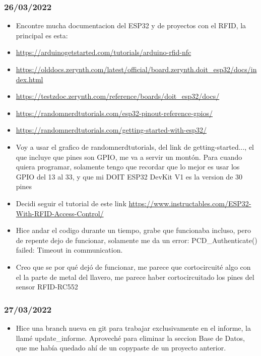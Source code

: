 \documentclass[../main.tex]{subfiles}
\begin{document}
\subsubsection{26/03/2022}
\begin{itemize}
	\item Encontre mucha documentacion del ESP32 y de proyectos con el RFID, la principal es esta:
	\item \url{https://arduinogetstarted.com/tutorials/arduino-rfid-nfc}
	\item \url{https://olddocs.zerynth.com/latest/official/board.zerynth.doit_esp32/docs/index.html}
	\item \url{https://testzdoc.zerynth.com/reference/boards/doit_esp32/docs/}
	\item \url{https://randomnerdtutorials.com/esp32-pinout-reference-gpios/}
	\item \url{https://randomnerdtutorials.com/getting-started-with-esp32/}
	\item Voy a usar el grafico de randomnerdtutorials, del link de getting-started...,
	      el que incluye que pines son GPIO, me va a servir un montón.
	      Para cuando quiera programar, solamente tengo que recordar que lo mejor es usar los
	      GPIO del 13 al 33, y que mi DOIT ESP32 DevKit V1 es la version de 30 pines
	\item Decidi seguir el tutorial de este link
	      \url{https://www.instructables.com/ESP32-With-RFID-Access-Control/}
	\item Hice andar el codigo durante un tiempo, grabe que funcionaba incluso, pero de
	      repente dejo de funcionar, solamente me da un error:
	      PCD\_Authenticate() failed: Timeout in communication.
	\item Creo que se por qué dejó de funcionar, me parece que cortocircuité algo
	      con el la parte de metal del llavero, me parece haber cortocircuitado
	      los pines del sensor RFID-RC552

\end{itemize}
\subsubsection{27/03/2022}
\begin{itemize}
	\item Hice una branch nueva en git para trabajar exclusivamente en el informe,
	      la llamé update\_informe.
	      Aproveché para eliminar la seccion Base de Datos, que me había quedado ahí
	      de un copypaste de un proyecto anterior.
\end{itemize}
\end{document}
